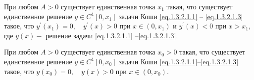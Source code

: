 {\begin{lemma}\label{AbEI:lemm3} При любом $ A>0 $  существует единственная
точка $ x_1 $   такая, что существует единственное решение $ y \in C^4[0,x_1] $ задачи
Коши \eqref{eq.1.3.2.1.1} -- \eqref{eq.1.3.2.1.3} такое, что $ y^{\prime}(x_1)=0,\quad y^{\prime}(x)>0  $    при
$ x \in (0,x_1) $ и $ y^{\prime}(x)<0 $ при $ x>x_1, $ где $ y(x)-$ решение
задачи \eqref{eq.1.3.2.1.1} --\eqref{eq.1.3.2.1.3}.
\end{lemma}

%
%

\begin{lemma}\label{AbEI:lemm4} При любом $ A>0 $   существует единственная точка
$ x_0>0 $ такая, что существует единственное решение $ y \in C^4[0,x_0] $
задачи Коши \eqref{eq.1.3.2.1.1}--\eqref{eq.1.3.2.1.3} такое, что  $ y(x_0)=0, \quad y(x)>0 $  при $ x \in (0,x_0). $
\end{lemma}

}
